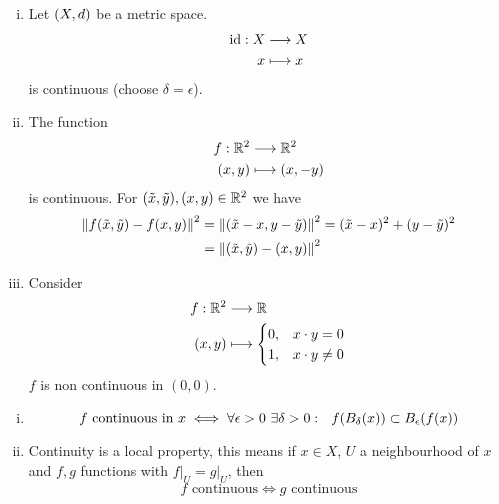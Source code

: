 \documentclass[../../script.tex]{subfiles}
\begin{document}
\begin{eg}
    \begin{enumerate}[(i)]
        \item Let $\metric$ be a metric space.
        \begin{align*}
            \idf: X &\longrightarrow X \\
            x &\longmapsto x
        \end{align*}
        is continuous (choose $\delta = \epsilon$).

        \item The function 
        \begin{align*}
            f: \realn^2 &\longrightarrow \realn^2 \\
            (x, y) &\longmapsto (x, -y)
        \end{align*}
        is continuous. For $(\tilde{x}, \tilde{y}), (x, y) \in \realn^2$ we have 
        \begin{align*}
            \norm{f(\tilde{x}, \tilde{y}) - f(x, y)}^2 &= \norm{(\tilde{x} - x, y - \tilde{y})}^2 = (\tilde{x} - x)^2 + (y - \tilde{y})^2 \\
            &= \norm{(\tilde{x}, \tilde{y}) - (x, y)}^2
        \end{align*}

        \item Consider 
        \begin{align*}
            f: \realn^2 &\longrightarrow \realn \\
            (x, y) &\longmapsto \begin{cases}
                0, &x \cdot y = 0 \\
                1, &x \cdot y \ne 0
            \end{cases}
        \end{align*}
        $f$ is non continuous in $(0, 0)$.
    \end{enumerate}
\end{eg}

\begin{rem}
    \begin{enumerate}[(i)]
        \item \[f \text{ continuous in } x \iff \forall \epsilon > 0 ~\exists \delta > 0: ~~f(\oball[\delta](x)) \subset \oball(f(x))\]
        \item Continuity is a local property, this means if $x \in X$, $U$ a neighbourhood of $x$ and $f, g$ functions with $f \vert_U = g \vert_U$, then 
        \[
            f \text{ continuous} \iff g \text{ continuous}
        \]
    \end{enumerate}
\end{rem}
\end{document}

